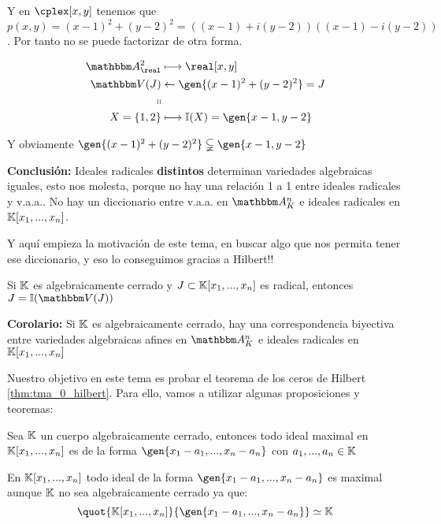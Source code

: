 \begin{itemize}
\begin{example}
\begin{enumerate}
			Y en $\cplex[x,y]$ tenemos que $p(x,y)=(x-1)^2+(y-2)^2=((x-1)+i(y-2))((x-1)-i(y-2))$. Por tanto no se puede factorizar de otra forma.

			\begin{align*}
				\A^2_{\real} & \longmapsto  \real[x,y] \\
				\V(J) & \leftarrow  \gen{(x-1)^2+(y-2)^2}=J \\
				\shortparallel & \\
				X=\{1,2\} & \longmapsto  \I(X)=\gen{x-1,y-2}\\
			\end{align*}

			Y obviamente $\gen{(x-1)^2+(y-2)^2} \subsetneqq \gen{x-1,y-2}$
		\end{enumerate}
	\end{example}
\end{itemize}

\textbf{Conclusión:} Ideales radicales \textbf{distintos} determinan variedades algebraicas iguales, esto nos molesta, porque no hay una relación 1 a 1 entre ideales radicales y v.a.a.. No hay un diccionario entre v.a.a. en $\Akn$ e ideales radicales en $\mathbb{K}[x_1,...,x_n]$.

Y aquí empieza la motivación de este tema, en buscar algo que nos permita tener ese diccionario, y eso lo conseguimos gracias a Hilbert!!

\begin{theorem}\label{thm:tma_0_hilbert}
	Si $\mathbb{K}$ es algebraicamente cerrado y $J \subset \mathbb{K}[x_1,...,x_n]$ es radical, entonces $J=\I(\V(J))$
\end{theorem}



\textbf{Corolario:}	Si $\mathbb{K}$ es algebraicamente cerrado, hay una correspondencia biyectiva entre variedades algebraicas afines en $\Akn$ e ideales radicales en $\mathbb{K}[x_1,...,x_n]$

Nuestro objetivo en este tema es probar el teorema de los ceros de Hilbert \ref{thm:tma_0_hilbert}. Para ello, vamos a utilizar algunas proposiciones y teoremas:

\begin{theorem} \label{thm:Basico}
	Sea $\mathbb{K}$ un cuerpo algebraicamente cerrado, entonces todo ideal maximal en $\mathbb{K}[x_1,...,x_n]$ es de la forma $\gen{x_1-a_1,...,x_n-a_n}$ con $a_1,...,a_n \in \mathbb{K}$
\end{theorem}

\obs En $\mathbb{K}[x_1,...,x_n]$ todo ideal de la forma $\gen{x_1-a_1,...,x_n-a_n}$ es maximal aunque $\mathbb{K}$ no sea algebraicamente cerrado ya que:
$$ \quot{\K[x_1,...,x_n]}{\gen{x_1-a_1,...,x_n-a_n}} \simeq \K $$

